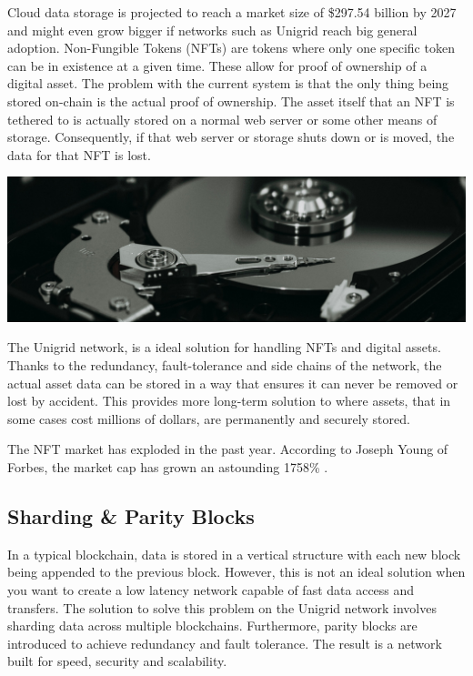 \documentclass[a4paper,oneside]{article}
\begin{document}
\noindent Cloud data storage is projected to reach a market size of \$297.54 billion by 2027 \cite{fort2021} and might even grow bigger if networks such as Unigrid reach big general adoption. Non-Fungible Tokens (NFTs) are tokens where only one specific token can be in existence at a given time. These allow for proof of ownership of a digital asset. The problem with the current system is that the only thing being stored on-chain is the actual proof of ownership. The asset itself that an NFT is tethered to is actually stored on a normal web server or some other means of storage. Consequently, if that web server or storage shuts down or is moved, the data for that NFT is lost.

\vspace{0.2cm}
\begin{mdframed}[style=textimage]
	\includegraphics[width=381pt]{hard-drive}
\end{mdframed}

\noindent The Unigrid network, is a ideal solution for handling NFTs and digital assets. Thanks to the redundancy, fault-tolerance and side chains of the network, the actual asset data can be stored in a way that ensures it can never be removed or lost by accident. This provides more long-term solution to where assets, that in some cases cost millions of dollars, are permanently and securely stored.

The NFT market has exploded in the past year. According to Joseph Young of Forbes, the market cap has grown an astounding 1758\% \cite{young2021}.

\subsection{Sharding \& Parity Blocks}
In a typical blockchain, data is stored in a vertical structure with each new block being appended to the previous block. However, this is not an ideal solution when you want to create a low latency network capable of fast data access and transfers. The solution to solve this problem on the Unigrid network involves sharding data across multiple blockchains. Furthermore, parity blocks are introduced to achieve redundancy and fault tolerance. The result is a network built for speed, security and scalability.
\end{document}
